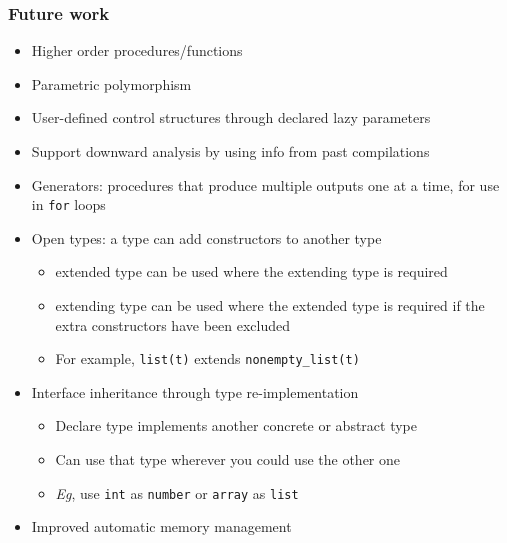 \documentclass[12pt]{beamer}
\begin{document}
\begin{frame}[fragile]
\frametitle{Future work}
\begin{itemize}
\item Higher order procedures/functions
\item Parametric polymorphism
\item User-defined control structures through declared lazy parameters
\item Support downward analysis by using info from past compilations
\item Generators:  procedures that produce multiple outputs one at a time, for
  use in \texttt{for} loops
\item Open types: a type can add constructors to another type
  \begin{itemize}
  \item extended type can be used where the extending type is required
  \item extending type can be used where the extended type is required if the
  extra constructors have been excluded
  \item For example, \texttt{list(t)} extends \texttt{nonempty\_list(t)}
  \end{itemize}
\item Interface inheritance through type re-implementation
  \begin{itemize}
  \item Declare type implements another concrete or abstract type
  \item Can use that type wherever you could use the other one
  \item \emph{Eg}, use \texttt{int} as \texttt{number} or \texttt{array} as
    \texttt{list}
  \end{itemize}
\item Improved automatic memory management
\end{itemize}
\end{frame}
\end{document}

